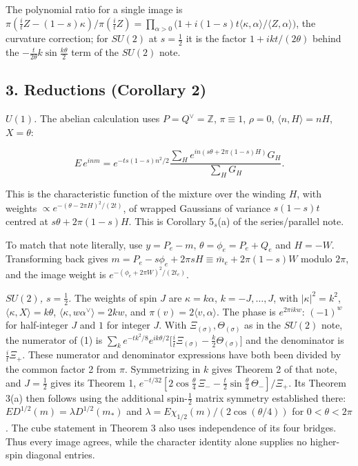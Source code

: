 \documentclass[11pt,a4paper]{article}
\begin{document}
The polynomial ratio for a single image is
\(\pi(\frac it Z-(1-s)\kappa)/\pi(\frac itZ)=\prod_{\alpha>0}\bigl(1+i(1-s)t\langle\kappa,\alpha\rangle/\langle Z,\alpha\rangle\bigr)\),
the curvature correction; for \(SU(2)\) at \(s=\frac12\) it is the
factor \(1+ikt/(2\theta)\) behind the
\(-\frac t{2\theta}k\sin\frac{k\theta}2\) term of the \(SU(2)\) note.

\hypertarget{reductions-corollary-2}{%
\subsection{3. Reductions (Corollary 2)}\label{reductions-corollary-2}}

\emph{\(U(1)\).} The abelian calculation uses \(P=Q^\vee=\mathbb Z\),
\(\pi\equiv1\), \(\rho=0\), \(\langle n,H\rangle=nH\), \(X=\theta\):

\[E\,e^{inm}=e^{-ts(1-s)n^2/2}
\frac{\sum_He^{in(s\theta+2\pi(1-s)H)}G_H}{\sum_HG_H}.\]

This is the characteristic function of the mixture over the winding
\(H\), with weights \(\propto e^{-(\theta-2\pi H)^2/(2t)}\), of wrapped
Gaussians of variance \(s(1-s)t\) centred at \(s\theta+2\pi(1-s)H\).
This is Corollary 5\(_s\)(a) of the series/parallel note.

To match that note literally, use \(y=P_e-m\), \(\theta=\phi_e=P_e+Q_e\)
and \(H=-W\). Transforming back gives
\(m=P_e-s\phi_e+2\pi sH\equiv\bar m_e+2\pi(1-s)W\) modulo \(2\pi\), and
the image weight is \(e^{-(\phi_e+2\pi W)^2/(2t_e)}\).

\emph{\(SU(2)\), \(s=\frac12\).} The weights of spin \(J\) are
\(\kappa=k\alpha\), \(k=-J,\dots,J\), with \(|\kappa|^2=k^2\),
\(\langle\kappa,X\rangle=k\theta\),
\(\langle\kappa,w\alpha^\vee\rangle=2kw\), and
\(\pi(v)=2\langle v,\alpha\rangle\). The phase is \(e^{2\pi ikw}\):
\((-1)^w\) for half-integer \(J\) and \(1\) for integer \(J\). With
\(\Xi_{(\sigma)},\Theta_{(\sigma)}\) as in the \(SU(2)\) note, the
numerator of (1) is
\(\sum_ke^{-tk^2/8}e^{ik\theta/2}\bigl[\frac it\Xi_{(\sigma)}-\frac k2\Theta_{(\sigma)}\bigr]\)
and the denominator is \(\frac it\Xi_+\). These numerator and
denominator expressions have both been divided by the common factor 2
from \(\pi\). Symmetrizing in \(k\) gives Theorem 2 of that note, and
\(J=\frac12\) gives its Theorem 1,
\(e^{-t/32}[2\cos\frac\theta4\,\Xi_--\frac t2\sin\frac\theta4\,\Theta_-]/\Xi_+\).
Its Theorem 3(a) then follows using the additional spin-\(\frac12\)
matrix symmetry established there: \(E D^{1/2}(m)=\lambda D^{1/2}(m_*)\)
and \(\lambda=E\chi_{1/2}(m)/(2\cos(\theta/4))\) for \(0<\theta<2\pi\).
The cube statement in Theorem 3 also uses independence of its four
bridges. Thus every image agrees, while the character identity alone
supplies no higher-spin diagonal entries.
\end{document}
